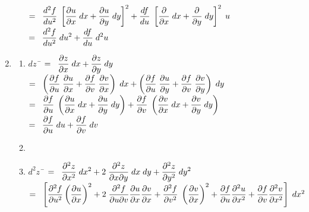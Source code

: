 \begin{example}
\begin{enumerate}
\begin{enumerate}
\begin{tabbing}
\>$ = \;\; \displaystyle\frac{d^2 f}{du^2} \; \left[\displaystyle\frac{\partial u}{\partial x} \; dx +  \displaystyle\frac{\partial u}{\partial y} \; dy \right]^2+ \displaystyle\frac{d f}{du} \; \left[\displaystyle\frac{\partial }{\partial x} \; dx +  \displaystyle\frac{\partial }{\partial y} \; dy \right]^2 \; u $\\[0.2cm]
\> $ = \;\;  \displaystyle\frac{d^2 f}{d u^2}\; du^2 +  \displaystyle\frac{d f}{d u}\; d^2 u$
\end{tabbing}
\end{enumerate}
\item 
\begin{enumerate}
\item \begin{tabbing}
$dz \;\; $\= $ = \;\; \displaystyle\frac{\partial z}{\partial x} \; dx + \displaystyle\frac{\partial z}{\partial y} \; dy $\\[0.18cm]
\> $ = \;\;  \left( \displaystyle\frac{\partial f}{\partial u}  \; \displaystyle\frac{\partial u}{\partial x} + \displaystyle\frac{\partial f}{\partial v}  \; \displaystyle\frac{\partial v}{\partial x}\right) \; dx + \left(\displaystyle\frac{\partial f}{\partial u}  \; \displaystyle\frac{\partial u}{\partial y} +\displaystyle\frac{\partial f}{\partial v}  \; \displaystyle\frac{\partial v}{\partial y}\right) \; dy$\\[0.18cm]
\> $ = \;\; \displaystyle\frac{\partial f}{\partial u}  \; \left(\displaystyle\frac{\partial u}{\partial x} \; dx + \displaystyle\frac{\partial u}{\partial y} \; dy \right ) + \displaystyle\frac{\partial f}{\partial v}  \; \left( \displaystyle\frac{\partial v}{\partial x} \;  dx
+  \displaystyle\frac{\partial v}{\partial y} \; dy \right)$\\[0.18cm]
\> $ = \;\; \displaystyle\frac{\partial f}{\partial u}  \; du + \displaystyle\frac{\partial f}{\partial v} \; dv $
\end{tabbing}
\item[]
\item \begin{tabbing}
$d^2 z \;\; $\= $ = \;\; \displaystyle\frac{\partial^2 z}{\partial x^2} \; dx^2 + 2 \; \displaystyle\frac{\partial^2 z}{\partial x \partial y}  \; dx \; dy + \displaystyle\frac{\partial^2 z}{\partial y^2} \; dy^2$\\[0.18cm]
\>$ = \;\; \left[\displaystyle\frac{\partial^2 f}{\partial u^2} \left(\displaystyle\frac{\partial u}{\partial x} \right)^2 + 2\; \displaystyle\frac{\partial^2 f}{\partial u \partial v}\displaystyle\frac{\partial u}{\partial x}\displaystyle\frac{\partial v}{\partial x}+
\displaystyle\frac{\partial^2 f}{\partial v^2} \; \left(\displaystyle\frac{\partial v}{\partial x} \right )^2+\displaystyle\frac{\partial f}{\partial u}
\displaystyle\frac{\partial^2 u}{\partial x^2} +\displaystyle\frac{\partial f}{\partial v}\displaystyle\frac{\partial^2 v}{\partial x^2}\right]\; dx^2
$\\[0.18cm]

\end{tabbing}
\end{enumerate}
\end{enumerate}
\end{example}
